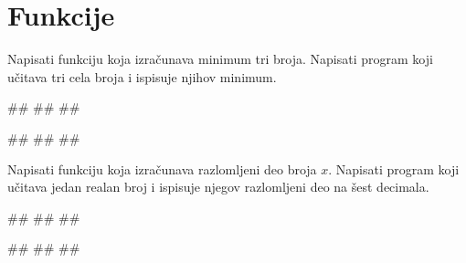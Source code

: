 \newpage
\section{Funkcije}

\begin{Exercise}[label=FUN_01] 
Napisati funkciju  koja izračunava
minimum tri broja. Napisati program koji učitava tri cela broja i
ispisuje njihov minimum.

\begin{miditest}
\begin{upotreba}{1}
#\naslovInt#
##
##
\end{upotreba}
\end{miditest}
\begin{miditest}
\begin{upotreba}{2}
#\naslovInt#
##
##
\end{upotreba}
\end{miditest}
\end{Exercise}
\ifresenja 
\begin{Answer}[ref=FUN_01]
\end{Answer} 
\fi

\begin{Exercise}[label=FUN_02] 
Napisati funkciju  koja
izračunava razlomljeni deo broja $x$. Napisati program koji učitava
jedan realan broj i ispisuje njegov razlomljeni deo na šest decimala.
 
\begin{miditest}
\begin{upotreba}{1}
#\naslovInt#
##
##
\end{upotreba}
\end{miditest}
\begin{miditest}
\begin{upotreba}{2}
#\naslovInt#
##
##
\end{upotreba}
\end{miditest}
\end{Exercise}
\ifresenja 
\begin{Answer}[ref=FUN_02]
\end{Answer} 
\fi

